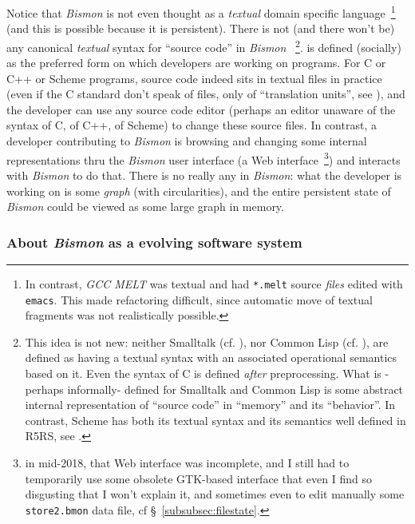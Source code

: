 Notice that \textit{Bismon} is not even thought as a \emph{textual}
domain specific language~\footnote{In contrast, \emph{GCC MELT} was
  textual and had \texttt{*.melt} source \emph{files} edited with
  \texttt{emacs}. This made refactoring difficult, since automatic
  move of textual fragments was not realistically possible.} (and this
is possible because it is persistent). There is not (and there won't
be) any canonical \emph{textual} syntax for ``source code'' in
\textit{Bismon} ~\footnote{This idea is not new: neither Smalltalk
  (cf. \cite{Goldberg:1983:Smalltalk}), nor Common Lisp
  (cf. \cite{Steele:1990:CommonLisp}), are defined as having a textual
  syntax with an associated operational semantics based on it. Even
  the syntax of C is defined \emph{after} preprocessing. What is
  -perhaps informally- defined for Smalltalk and Common Lisp is some
  abstract internal representation of ``source code'' in ``memory''
  and its ``behavior''. In contrast, Scheme has both its textual
  syntax and its semantics well defined in R5RS, see
  \cite{Adams:1998:R5RS}.}.  is
defined (socially) as the preferred form on which developers are
working on programs. For C or C++ or Scheme programs, source code
indeed sits in textual files in practice (even if the C standard don't
speak of files, only of ``translation units'', see \cite{C11:std}),
and the developer can use any source code editor (perhaps an editor
unaware of the syntax of C, of C++, of Scheme) to change these source
files. In contrast, a developer contributing to \textit{Bismon} is
browsing and changing some internal representations thru the
\textit{Bismon} user interface (a Web interface~\footnote{in mid-2018,
  that Web interface was incomplete, and I still had to temporarily
  use some obsolete GTK-based interface that even I find so disgusting
  that I won't explain it, and sometimes even to edit manually some
  \texttt{store2.bmon} data file, cf §~\ref{subsubsec:filestate}.})
and interacts with \textit{Bismon} to do that. There is no really any
 in
\textit{Bismon}: what the developer is working on is some \emph{graph}
(with circularities), and the entire persistent state of \emph{Bismon}
could be viewed as some large graph in memory.


\subsubsection{About \emph{Bismon} as a evolving software system}

